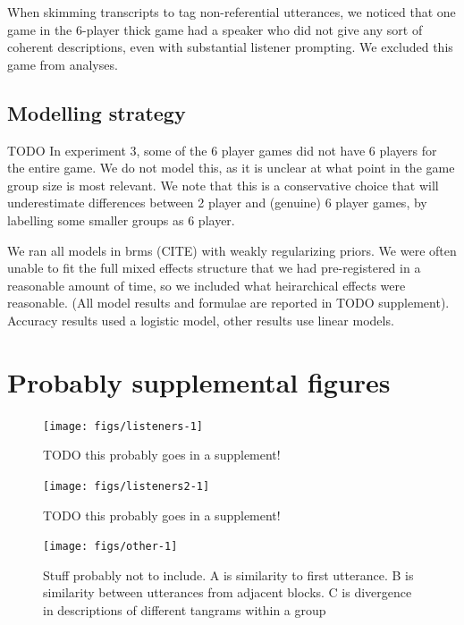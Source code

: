 \documentclass[
  english,
  a4paper,
]{article}
\begin{document}
When skimming transcripts to tag non-referential utterances, we noticed that one game in the 6-player thick game had a speaker who did not give any sort of coherent descriptions, even with substantial listener prompting. We excluded this game from analyses.

\hypertarget{modelling-strategy}{%
\subsection{Modelling strategy}\label{modelling-strategy}}

TODO
In experiment 3, some of the 6 player games did not have 6 players for the entire game. We do not model this, as it is unclear at what point in the game group size is most relevant. We note that this is a conservative choice that will underestimate differences between 2 player and (genuine) 6 player games, by labelling some smaller groups as 6 player.

We ran all models in brms (CITE) with weakly regularizing priors. We were often unable to fit the full mixed effects structure that we had pre-registered in a reasonable amount of time, so we included what heirarchical effects were reasonable. (All model results and formulae are reported in TODO supplement). Accuracy results used a logistic model, other results use linear models.

\hypertarget{probably-supplemental-figures}{%
\section{Probably supplemental figures}\label{probably-supplemental-figures}}

\begin{figure}[t!]

{\centering \texttt{[image: figs/listeners-1]} 

}

\caption{TODO this probably goes in a supplement! }\label{fig:listeners}
\end{figure}

\begin{figure}[t!]

{\centering \texttt{[image: figs/listeners2-1]} 

}

\caption{TODO this probably goes in a supplement! }\label{fig:listeners2}
\end{figure}

\begin{figure}[t!]

{\centering \texttt{[image: figs/other-1]} 

}

\caption{Stuff probably not to include. A is similarity to first utterance. B is similarity between utterances from adjacent blocks. C is divergence in descriptions of different tangrams within a group}\label{fig:other}
\end{figure}
\end{document}
